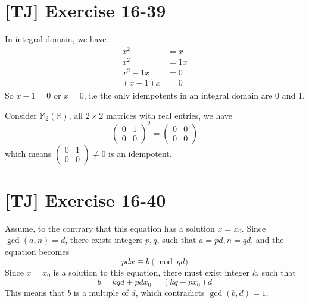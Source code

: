 \documentclass[a4paper,11pt,twocolumn]{article}
\begin{document}
  \section{[TJ] Exercise 16-39}
  In integral domain, we have
  \begin{align*}
    x^2 &= x \\
    x^2 &= 1x \\
    x^2 - 1x &= 0 \\
    (x-1)x &= 0
  \end{align*}
  So $x-1 = 0$ or $x = 0$, i.e the only idempotents in an integral domain are 0 and 1. \par
  Consider $\mathbb{M}_2(\mathbb{R})$, all $2 \times 2$ matrices with real entries, we have
  $$ \begin{pmatrix} 0 & 1 \\ 0 & 0  \end{pmatrix} ^ 2 = \begin{pmatrix} 0 & 0 \\ 0 & 0 \end{pmatrix} $$
  which means $\begin{pmatrix} 0 & 1 \\ 0 & 0  \end{pmatrix} \neq 0$ is an idempotent.

  \section{[TJ] Exercise 16-40}
  Assume, to the contrary that this equation has a solution $x = x_0$. Since $\gcd(a, n) = d$, there exists integers $p, q$, such that $a = pd, n = qd$, and the equation becomes
 $$ pdx \equiv b \pmod{qd} $$
 Since $x = x_0$ is a solution to this equation, there must exist integer $k$, such that
 $$ b = kqd + pdx_0 = (kq + px_0)d $$
 This means that $b$ is a multiple of $d$, which contradicts $\gcd(b, d) = 1$.
\end{document}
